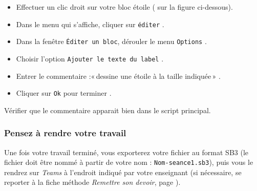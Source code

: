 \begin{itemize}
\item Effectuer un clic droit sur votre bloc étoile ( sur la figure ci-dessous).
\item Dans le menu qui s’affiche, cliquer sur \texttt{éditer}  .
\item Dans la fenêtre \texttt{Éditer un bloc}, dérouler le menu \texttt{Options} .
\item Choisir l’option \texttt{Ajouter le texte du label}  .
\item Entrer le commentaire :«\,dessine une étoile à la taille indiquée\,» .
\item Cliquer sur \texttt{Ok} pour terminer .
\end{itemize}




Vérifier que le commentaire apparait bien dans le script principal.


\subsubsection{Pensez à rendre votre travail}
Une fois votre travail terminé, vous exporterez votre fichier au format SB3 (le fichier doit être nommé à partir de votre nom : \texttt{Nom-seance1.sb3}), puis vous le rendrez sur \emph{Teams} à l'endroit indiqué par votre enseignant (si nécessaire, se reporter à la fiche méthode \emph{Remettre son devoir}, page \pageref{TeamsRemettreDevoir}).

